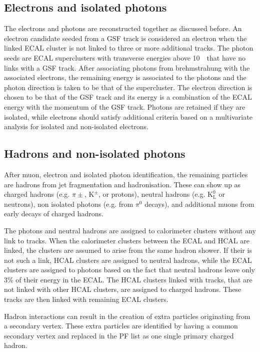 \subsection{Electrons and isolated photons}
\label{sec:Electron}
The electrons and photons are reconstructed together as discussed before. An electron candidate seeded from a GSF track is considered an electron when the linked ECAL cluster is not linked to three or more additional tracks. The photon seeds are ECAL superclusters with transverse energies above 10~\GeV\ that have no links with a GSF track. After associating photons from brehmstrahung with the associated electrons, the remaining energy is associated to the photons and the photon direction is taken to be that of the supercluster. The electron direction is chosen to be that of the GSF track and its energy is a combination of the ECAL energy with the momentum of the GSF track. Photons are retained if they are isolated, while electrons should satisfy additional criteria based on a multivariate analysis for isolated and non-isolated electrons. 
\subsection{Hadrons and non-isolated photons}
\label{sec:Hadron}
After muon, electron and isolated photon identification, the remaining particles are hadrons from jet fragmentation and hadronisation. These can show up as charged hadrons (e.g. $\pi{\pm}$, $\mathrm{K}^{\pm}$, or protons), neutral hadrons (e.g. $\mathrm{K}^{0}_{\mathrm{L}}$ or neutrons), non isolated photons (e.g. from $\pi^0$ decays), and additional muons from early decays of charged hadrons. 

The photons and neutral hadrons are assigned to calorimeter clusters without any link to tracks. When the calorimeter clusters between the ECAL and HCAL are linked, the clusters are assumed to arise from the same hadron shower. If their is not such a link, HCAL clusters are assigned to neutral hadrons, while the ECAL clusters are assigned to photons based on the fact that neutral hadrons leave only 3\% of their energy in the ECAL. The HCAL clusters linked with tracks, that are not linked with other HCAL clusters, are assigned to charged hadrons. These tracks are then linked with remaining ECAL clusters. 

Hadron interactions can result in the creation of extra particles originating from a secondary vertex. These extra particles are identified by having a common secondary vertex and replaced in the PF list as one single primary charged hadron. 


